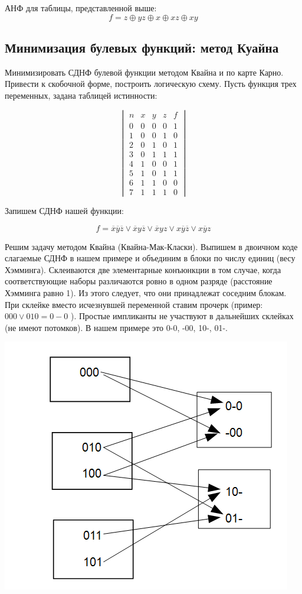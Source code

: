 \documentclass{article}
\begin{document}
АНФ для таблицы, представленной выше: $$f = z \oplus yz \oplus x \oplus xz \oplus xy$$

\subsection{Минимизация булевых функций: метод Куайна}

Минимизировать СДНФ булевой функции методом Квайна и по карте Карно. Привести к скобочной форме, построить логическую схему. Пусть функция трех переменных, задана таблицей истинности:

$$\begin{vmatrix}
    n & x & y & z & f \\
    0 & 0 & 0 & 0 & 1 \\
    1 & 0 & 0 & 1 & 0 \\
    2 & 0 & 1 & 0 & 1 \\
    3 & 0 & 1 & 1 & 1 \\
    4 & 1 & 0 & 0 & 1 \\
    5 & 1 & 0 & 1 & 1 \\
    6 & 1 & 1 & 0 & 0 \\
    7 & 1 & 1 & 1 & 0
\end{vmatrix}
$$

Запишем СДНФ нашей функции:

$$f = \overline{x} \overline{y} \overline{z} \lor \overline{x} y \overline{z} \lor \overline{x} y z \lor x \overline{y} \overline{z} \lor x \overline{y} z$$

Решим задачу методом Квайна (Квайна-Мак-Класки). Выпишем в двоичном коде слагаемые СДНФ в нашем примере и объединим в блоки по числу единиц (весу Хэмминга). Склеиваются две элементарные конъюнкции в том случае, когда соответствующие наборы различаются ровно в одном разряде (расстояние Хэмминга равно 1). Из этого следует, что они принадлежат соседним блокам. При склейке вместо исчезнувшей переменной ставим прочерк (пример: $000 \lor 010 = 0-0$ ). Простые импликанты не участвуют в дальнейших склейках (не имеют потомков). В нашем примере это 0-0, -00, 10-, 01-.

\begin{center}
    \includegraphics{images/51.png}
\end{center}
\end{document}
